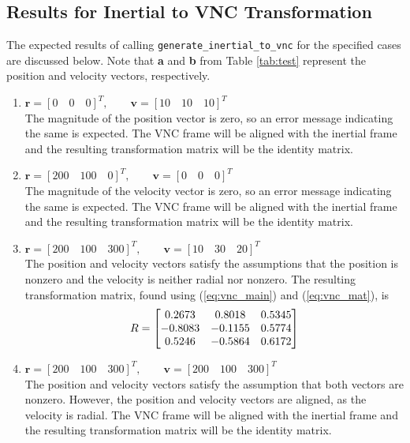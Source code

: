 \documentclass[11pt,fleqn]{report}
\begin{document}
\subsection{Results for Inertial to VNC Transformation}
The expected results of calling \texttt{generate\_inertial\_to\_vnc} for the
specified cases are discussed below. Note that \textbf{a} and \textbf{b} from
Table \ref{tab:test} represent the position and velocity vectors, respectively.
\begin{enumerate}
 \item $\textbf{r} = [0 \quad 0 \quad 0]^T, \qquad
\textbf{v} = [10 \quad 10 \quad 10]^T$ \\
 The magnitude of the position vector is zero, so an error message
 indicating the same is expected. The VNC frame will be aligned with
 the inertial frame and the resulting transformation matrix will be
 the identity matrix.

 \item $\textbf{r} = [200 \quad 100 \quad 0]^T, \qquad
\textbf{v} = [0 \quad 0 \quad 0]^T$ \\
 The magnitude of the velocity vector is zero, so an error message
 indicating the same is expected. The VNC frame will be aligned with
 the inertial frame and the resulting transformation matrix will be
 the identity matrix.

\setcounter{enumi}{4}
 \item $\textbf{r} = [200 \quad 100 \quad 300]^T, \qquad
\textbf{v} = [10\quad 30\quad 20]^T$ \\
 The position and velocity vectors satisfy the assumptions that
 the position is nonzero and the velocity is neither radial nor nonzero.
 The resulting transformation matrix, found using (\ref{eq:vnc_main})
 and (\ref{eq:vnc_mat}), is
 \begin{equation*}
\hfill R = \begin{bmatrix}0.2673 &0.8018 &0.5345\\
 -0.8083 & -0.1155 &0.5774 \\
0.5246 & -0.5864 &0.6172 
 \end{bmatrix} \hfill
 \end{equation*}

\item $\textbf{r} = [200 \quad 100 \quad 300]^T, \qquad
\textbf{v} = [200 \quad 100 \quad 300]^T$ \\
The position and velocity vectors satisfy the assumption that
both vectors are nonzero. However, the position and velocity vectors 
are aligned, as the velocity is radial. The VNC frame 
will be aligned with the inertial frame and the resulting transformation
matrix will be the identity matrix.
\end{enumerate}
\end{document}
